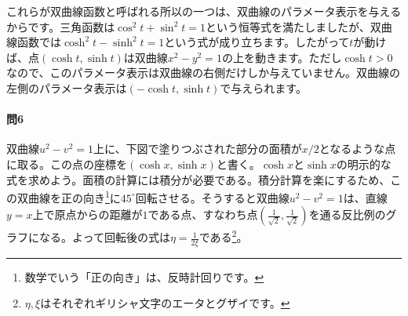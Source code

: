 これらが双曲線函数と呼ばれる所以の一つは、双曲線のパラメータ表示を与えるからです。三角函数は$\cos^2 t + \sin^2 t =1$という恒等式を満たしましたが、双曲線函数では$\cosh^2 t - \sinh^2 t = 1$という式が成り立ちます。したがって$t$が動けば、点$(\cosh t,\sinh t)$は双曲線$x^2-y^2=1$の上を動きます。ただし$\cosh t>0$なので、このパラメータ表示は双曲線の右側だけしか与えていません。双曲線の左側のパラメータ表示は$(-\cosh t,\sinh t)$で与えられます。

\paragraph{問6}
双曲線$u^2-v^2=1$上に、下図で塗りつぶされた部分の面積が$x/2$となるような点に取る。この点の座標を$(\cosh x, \sinh x)$と書く。$\cosh x$と$\sinh x$の明示的な式を求めよう。面積の計算には積分が必要である。積分計算を楽にするため、この双曲線を正の向き\footnote{数学でいう「正の向き」は、反時計回りです。}に$45^{\circ}$回転させる。そうすると双曲線$u^2-v^2=1$は、直線$y=x$上で原点からの距離が$1$である点、すなわち点$(\frac{1}{\sqrt{2}},\frac{1}{\sqrt{2}})$を通る反比例のグラフになる。よって回転後の式は$\eta=\frac{1}{2\xi}$である\footnote{$\eta,\xi$はそれぞれギリシャ文字のエータとグザイです。}。

